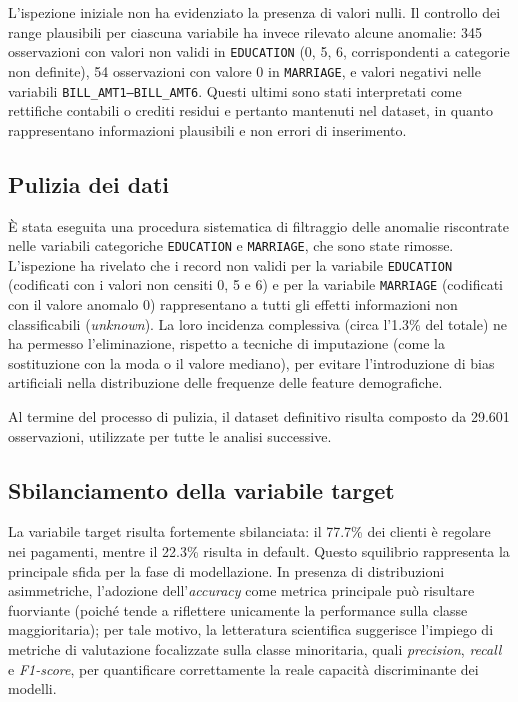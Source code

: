 \documentclass[11pt,a4paper]{article}
\begin{document}
L'ispezione iniziale non ha evidenziato la presenza di valori nulli. Il controllo dei range plausibili per ciascuna variabile ha invece rilevato alcune anomalie: 345 osservazioni con valori non validi in \texttt{EDUCATION} (0, 5, 6, corrispondenti a categorie non definite), 54 osservazioni con valore 0 in \texttt{MARRIAGE}, e valori negativi nelle variabili \texttt{BILL\_AMT1--BILL\_AMT6}. Questi ultimi sono stati interpretati come rettifiche contabili o crediti residui e pertanto mantenuti nel dataset, in quanto rappresentano informazioni plausibili e non errori di inserimento.

\subsection{Pulizia dei dati}

È stata eseguita una procedura sistematica di filtraggio delle anomalie riscontrate nelle variabili categoriche \texttt{EDUCATION} e \texttt{MARRIAGE}, che sono state rimosse. L'ispezione ha rivelato che i record non validi per la variabile \texttt{EDUCATION} (codificati con i valori non censiti 0, 5 e 6) e per la variabile \texttt{MARRIAGE} (codificati con il valore anomalo 0) rappresentano a tutti gli effetti informazioni non classificabili (\emph{unknown}). La loro incidenza complessiva (circa l'1.3\% del totale) ne ha permesso l'eliminazione, rispetto a tecniche di imputazione (come la sostituzione con la moda o il valore mediano), per evitare l'introduzione di bias artificiali nella distribuzione delle frequenze delle feature demografiche.

Al termine del processo di pulizia, il dataset definitivo risulta composto da 29.601 osservazioni, utilizzate per tutte le analisi successive.

\subsection{Sbilanciamento della variabile target}

La variabile target risulta fortemente sbilanciata: il 77.7\% dei clienti è regolare nei pagamenti, mentre il 22.3\% risulta in default. Questo squilibrio rappresenta la principale sfida per la fase di modellazione. In presenza di distribuzioni asimmetriche, l'adozione dell'\emph{accuracy} come metrica principale può risultare fuorviante (poiché tende a riflettere unicamente la performance sulla classe maggioritaria); per tale motivo, la letteratura scientifica \cite{fawcett2006} suggerisce l'impiego di metriche di valutazione focalizzate sulla classe minoritaria, quali \emph{precision}, \emph{recall} e \emph{F1-score}, per quantificare correttamente la reale capacità discriminante dei modelli.
\end{document}
